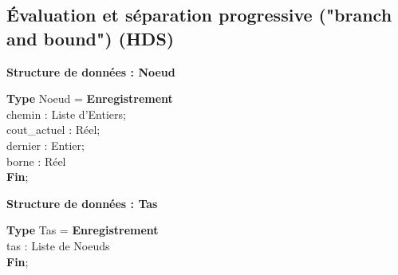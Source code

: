 \documentclass[a4paper, 12pt]{article}
\begin{document}
\subsection{Évaluation et séparation progressive ("branch and bound") (HDS)}

\begin{tcolorbox}[colback=darkWhite!75!white,colframe=black!30,left=5pt,right=5pt,top=5pt,bottom=5pt]
\textbf{Structure de données : Noeud}

\textbf{Type} Noeud = \textbf{Enregistrement} \\
\quad chemin : Liste d'Entiers; \\
\quad cout\_actuel : Réel; \\
\quad dernier : Entier; \\
\quad borne : Réel \\
\textbf{Fin};
\end{tcolorbox}

\begin{tcolorbox}[colback=darkWhite!75!white,colframe=black!30,left=5pt,right=5pt,top=5pt,bottom=5pt]
\textbf{Structure de données : Tas}

\textbf{Type} Tas = \textbf{Enregistrement} \\
\quad tas : Liste de Noeuds \\
\textbf{Fin};
\end{tcolorbox}

\vspace{5mm}
\end{document}
